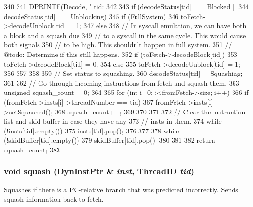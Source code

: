 \begin{DoxyCode}
340 {
341     DPRINTF(Decode, "[tid:%
342 
343     if (decodeStatus[tid] == Blocked ||
344         decodeStatus[tid] == Unblocking) {
345         if (FullSystem) {
346             toFetch->decodeUnblock[tid] = 1;
347         } else {
348             // In syscall emulation, we can have both a block and a squash due
349             // to a syscall in the same cycle.  This would cause both signals
350             // to be high.  This shouldn't happen in full system.
351             // @todo: Determine if this still happens.
352             if (toFetch->decodeBlock[tid])
353                 toFetch->decodeBlock[tid] = 0;
354             else
355                 toFetch->decodeUnblock[tid] = 1;
356         }
357     }
358 
359     // Set status to squashing.
360     decodeStatus[tid] = Squashing;
361 
362     // Go through incoming instructions from fetch and squash them.
363     unsigned squash_count = 0;
364 
365     for (int i=0; i<fromFetch->size; i++) {
366         if (fromFetch->insts[i]->threadNumber == tid) {
367             fromFetch->insts[i]->setSquashed();
368             squash_count++;
369         }
370     }
371 
372     // Clear the instruction list and skid buffer in case they have any
373     // insts in them.
374     while (!insts[tid].empty()) {
375         insts[tid].pop();
376     }
377 
378     while (!skidBuffer[tid].empty()) {
379         skidBuffer[tid].pop();
380     }
381 
382     return squash_count;
383 }
\end{DoxyCode}
\hypertarget{classDefaultDecode_a80c82399ba102a2f35e863ee05d2e9dd}{
\subsubsection[{squash}]{\setlength{\rightskip}{0pt plus 5cm}void squash ({\bf DynInstPtr} \& {\em inst}, \/  {\bf ThreadID} {\em tid})}}
\label{classDefaultDecode_a80c82399ba102a2f35e863ee05d2e9dd}
Squashes if there is a PC-\/relative branch that was predicted incorrectly. Sends squash information back to fetch. 



